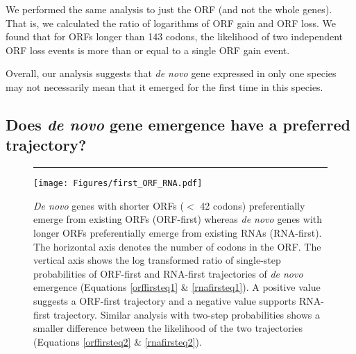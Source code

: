 \documentclass[12pt,a4paper]{article}
\begin{document}
We performed the same analysis to just the ORF (and not the whole genes). That is, we calculated the ratio of logarithms of ORF gain and ORF loss. We found that for ORFs longer than 143 codons, the likelihood of two independent ORF loss events is more than or equal to a single ORF gain event. 

Overall, our analysis suggests that \textit{de novo} gene expressed in only one species may not necessarily mean that it emerged for the first time in this species. 

\subsection{Does \textit{de novo} gene emergence have a preferred trajectory?}

\begin{figure}[!b]
\hrule
\vspace{1ex}
\centering
\texttt{[image: Figures/first\_ORF\_RNA.pdf]}
\caption{\textit{De novo} genes with shorter ORFs ($<$ 42 codons) preferentially emerge from existing ORFs (ORF-first) whereas \textit{de novo} genes with longer ORFs preferentially emerge from existing RNAs (RNA-first). The horizontal axis denotes the number of codons in the ORF. The vertical axis shows the log transformed ratio of single-step probabilities of ORF-first and RNA-first trajectories of \textit{de novo} emergence (Equations \ref{orffirsteq1} \& \ref{rnafirsteq1}). A positive value suggests a ORF-first trajectory and a negative value supports RNA-first trajectory. Similar analysis with two-step probabilities shows a smaller difference between the likelihood of the two trajectories (Equations \ref{orffirsteq2} \& \ref{rnafirsteq2}).}
\label{whoisfirst}
\end{figure}
\end{document}
